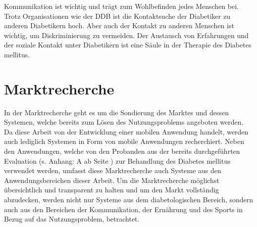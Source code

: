 \documentclass[a4paper,11pt]{article}%
\renewcommand{\\}{\vspace*{0.5\baselineskip} \newline}
\begin{document}
	Kommunikation ist wichtig und trägt zum Wohlbefinden jedes Menschen bei. Trotz Organisationen wie der DDB ist die Kontaktsuche der Diabetiker zu anderen Diabetikern hoch. Aber auch der Kontakt zu anderen Menschen ist wichtig, um Diskriminierung zu vermeiden. Der Austausch von Erfahrungen und der soziale Kontakt unter Diabetikern ist eine Säule in der Therapie des Diabetes mellitus.
\newpage
\section{Marktrecherche}
	In der Marktrecherche geht es um die Sondierung des Marktes und dessen Systemen, welche bereits zum Lösen des Nutzungsproblems angeboten werden.  Da diese Arbeit von der Entwicklung einer mobilen Anwendung handelt, werden auch lediglich Systemen in Form von mobile Anwendungen recherchiert. Neben den Anwendungen, welche von den Probanden aus der bereits durchgeführten Evaluation (s. Anhang: A  ab Seite \pageref{section:Evaluation}) zur Behandlung des Diabetes mellitus verwendet werden, umfasst diese Marktrecherche auch Systeme aus den Anwendungsbereichen dieser Arbeit. Um die Marktrecherche möglichst übersichtlich und transparent zu halten und um den Markt vollständig abzudecken, werden nicht nur Systeme aus dem diabetologischen Bereich, sondern auch aus den Bereichen der Kommunikation, der Ernährung und des Sports in Bezug auf das Nutzungsproblem, betrachtet.
\end{document}
